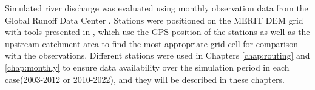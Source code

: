 Simulated river discharge was evaluated using monthly observation data from the Global Runoff Data Center \citep[GRDC, https://grdc.bafg.de,][]{fekete_global_2003}.
Stations were positioned on the MERIT DEM grid with tools presented in \cite{polcher_hydrological_2023}, which use the GPS position of the stations as well as the upstream catchment area to find the most appropriate grid cell for comparison with the observations. 
Different stations were used in Chapters \ref{chap:routing} and \ref{chap:monthly} to ensure data availability over the simulation period in each case(2003-2012 or 2010-2022), and they will be described in these chapters.

\begin{table}[htbp]
    \caption{Datasets used for evaluation.}
    \label{tab:obs-datasets}
\end{table}

